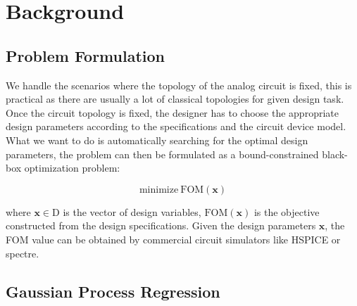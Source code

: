 \section{Background}


\subsection{Problem Formulation}


We handle the scenarios where the topology of the analog circuit is fixed, this
is practical as there are usually a lot of classical topologies for given
design task. Once the circuit topology is fixed, the designer has to choose the
appropriate design parameters according to the specifications and the circuit
device model. What we want to do is automatically searching for the optimal
design parameters, the problem can then be formulated as a bound-constrained
black-box optimization problem:

\begin{equation}
    \label{eq:Formulation}
    \text{minimize}~\mathrm{FOM}(\bm{x})
\end{equation}

where $\bm{x} \in \textrm{D}$ is the vector of design variables,
$\mathrm{FOM}(\bm{x})$ is the objective constructed from the design
specifications. Given the design parameters $\bm{x}$, the FOM value can be
obtained by commercial circuit simulators like HSPICE or spectre.



\subsection{Gaussian Process Regression}

